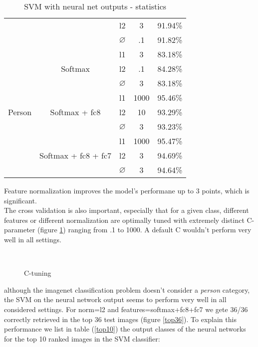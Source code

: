 \documentclass[11pt]{article}
\newcommand{\1}{\mathbbm{1}}
\newcommand{\0}{\mathbf{0}}
\begin{document}
\begin{table}[H]
\begin{tabular}{|c|c|c|c|c|}
							   									               &&l2& 3 & 91.94\%\\
							   									               &&$\varnothing$& .1 & 91.82\%\\
			\hline
			\multirow{9}{*}{Person} & \multirow{3}{*}{Softmax}  &l1& 3 & 83.18\%\\
							   									&&l2& .1 & 84.28\%\\
							   									&&$\varnothing$& 3 & 83.18\%\\
							   								    \cline{2-5}
							   		& \multirow{3}{*}{Softmax + fc8}  &l1& 1000 & 95.46\%\\
							   									      &&l2& 10 & 93.29\%\\
							   									      &&$\varnothing$& 3 & 93.23\%\\
							   									\cline{2-5}
							   		& \multirow{3}{*}{Softmax + fc8 + fc7}  &l1& 1000 & 95.47\%\\
							   									            &&l2& 3 & 94.69\%\\
							   									            &&$\varnothing$& 3 & 94.64\%\\
			\hline
			\end{tabular}
			\caption{SVM with neural net outputs - statistics}		    
		\end{table}
		Feature normalization improves the model's performane up to 3 points, which is significant.\\
		The cross validation is also important, especially that for a given class, different features or different normalization are optimally tuned with extremely distinct C-parameter (figure \ref{ctune}) ranging from .1 to 1000. A default C wouldn't perform very well in all settings.
		\begin{figure}[H]
			\caption{C-tuning\label{ctune}}
			\centering
			\\
		\end{figure}
		although the imagenet classification problem doesn't consider a \textit{person} category, the SVM on the neural network output seems to perform very well in all considered settings. For norm=l2 and features=softmax+fc8+fc7 we gete 36/36 correctly retrieved in the top 36 test images (figure \ref{top36}). To explain this performance we list in table (\ref{top10}) the output classes of the neural networks for the top 10 ranked images in the SVM classifier:
\end{document}
